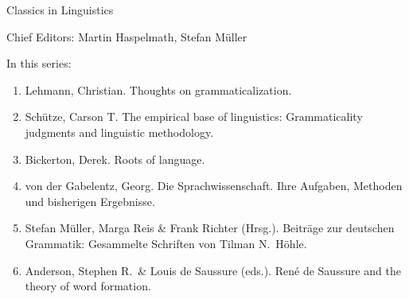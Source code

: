 {\large Classics in Linguistics}

\bigskip

Chief Editors: Martin Haspelmath, Stefan Müller

\bigskip

In this series:

\begin{enumerate}
\item Lehmann, Christian. Thoughts on grammaticalization.
\item Schütze, Carson T. The empirical base of linguistics: Grammaticality judgments and linguistic methodology.
\item Bickerton, Derek. Roots of language.
\item von der Gabelentz, Georg. Die Sprachwissenschaft.  Ihre Aufgaben, Methoden und bisherigen Ergebnisse.
\item Stefan Müller, Marga Reis \& Frank Richter (Hrsg.). Beiträge zur deutschen Grammatik: Gesammelte Schriften von Tilman N.\ Höhle.
\item Anderson, Stephen R.\ \& Louis de Saussure (eds.). René de Saussure and the theory of word formation.
\end{enumerate}


\vfill

